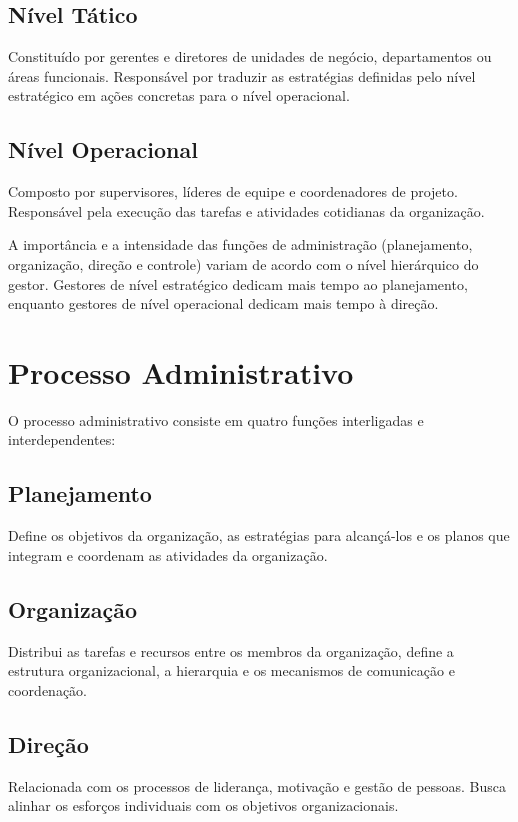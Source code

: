 \documentclass{article}
\begin{document}
\subsection{Nível Tático}
Constituído por gerentes e diretores de unidades de negócio, departamentos ou áreas funcionais. Responsável por traduzir as estratégias definidas pelo nível estratégico em ações concretas para o nível operacional.

\subsection{Nível Operacional}
Composto por supervisores, líderes de equipe e coordenadores de projeto. Responsável pela execução das tarefas e atividades cotidianas da organização.

A importância e a intensidade das funções de administração (planejamento, organização, direção e controle) variam de acordo com o nível hierárquico do gestor. Gestores de nível estratégico dedicam mais tempo ao planejamento, enquanto gestores de nível operacional dedicam mais tempo à direção.

\section{Processo Administrativo}

O processo administrativo consiste em quatro funções interligadas e interdependentes:

\subsection{Planejamento}
Define os objetivos da organização, as estratégias para alcançá-los e os planos que integram e coordenam as atividades da organização.

\subsection{Organização}
Distribui as tarefas e recursos entre os membros da organização, define a estrutura organizacional, a hierarquia e os mecanismos de comunicação e coordenação.

\subsection{Direção}
Relacionada com os processos de liderança, motivação e gestão de pessoas. Busca alinhar os esforços individuais com os objetivos organizacionais.
\end{document}
